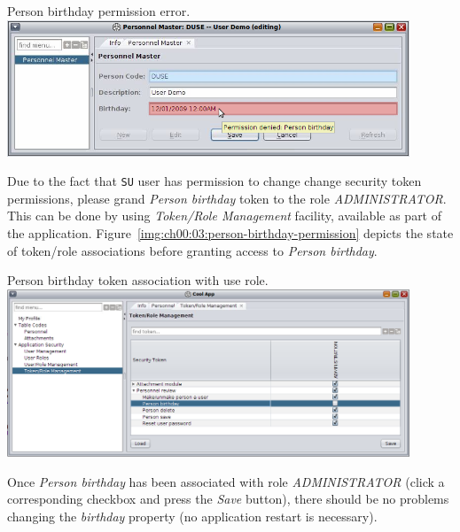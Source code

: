   \begin{image}{Person birthday permission error.}{\label{img:ch00:03:person-master-birthday-permission}}
    \includegraphics[width=0.9\textwidth]{parts/00-part/chapters/02-making-changes/images/12-person-master-birthday-permission.png}
  \end{image}

  Due to the fact that \texttt{SU} user has permission to change change security token permissions, please grand \emph{Person birthday} token to the role \emph{ADMINISTRATOR}.
  This can be done by using \emph{Token/Role Management} facility, available as part of the application.
  Figure~\ref{img:ch00:03:person-birthday-permission} depicts the state of token/role associations before granting access to \emph{Person birthday}.

  \begin{image}{Person birthday token association with use role.}{\label{img:ch00:03:person-birthday-permission}}
    \includegraphics[width=0.9\textwidth]{parts/00-part/chapters/02-making-changes/images/13-person-birthday-permission.png}
  \end{image}

  Once \emph{Person birthday} has been associated with role \emph{ADMINISTRATOR} (click a corresponding checkbox and press the \emph{Save} button), there should be no problems changing the \emph{birthday} property (no application restart is necessary).